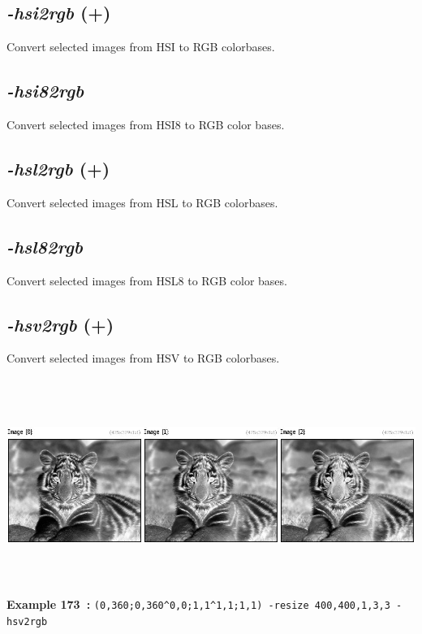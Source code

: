 \documentclass[a4paper,11pt,twoside]{book}
\begin{document}
\subsection{\emph{-hsi2rgb} (+)}\vspace*{-0.5em}
Convert selected images from HSI to RGB colorbases.


\subsection{\emph{-hsi82rgb} }\vspace*{-0.5em}
Convert selected images from HSI8 to RGB color bases.


\subsection{\emph{-hsl2rgb} (+)}\vspace*{-0.5em}
Convert selected images from HSL to RGB colorbases.


\subsection{\emph{-hsl82rgb} }\vspace*{-0.5em}
Convert selected images from HSL8 to RGB color bases.


\subsection{\emph{-hsv2rgb} (+)}\vspace*{-0.5em}
Convert selected images from HSV to RGB colorbases.
\begin{center}\includegraphics[keepaspectratio=true,height=7cm,width=\textwidth]{img/gmic_def173.jpg}\\
{\footnotesize \textbf{Example 173~:} \texttt{(0,360;0,360\textasciicircum 0,0;1,1\textasciicircum 1,1;1,1) -resize 400,400,1,3,3 -hsv2rgb}}
\end{center}
\end{document}
